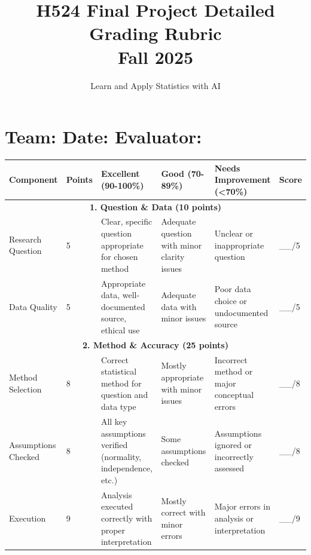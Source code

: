 \documentclass[11pt]{article}
\title{\textbf{H524 Final Project Detailed Grading Rubric\\Fall 2025}}
\author{Learn and Apply Statistics with AI}
\date{}
\begin{document}
\maketitle

\section*{Team: \underline{\hspace{4cm}} \quad Date: \underline{\hspace{3cm}} \quad Evaluator: \underline{\hspace{4cm}}}

\begin{longtable}{|p{3cm}|p{1.2cm}|p{3.5cm}|p{3.5cm}|p{3.5cm}|p{1.2cm}|}
\hline
\textbf{Component} & \textbf{Points} & \textbf{\textcolor{excellent}{Excellent (90-100\%)}} & \textbf{\textcolor{good}{Good (70-89\%)}} & \textbf{\textcolor{needs}{Needs Improvement (<70\%)}} & \textbf{Score} \\
\hline
\endhead

\multicolumn{6}{|c|}{\textbf{1. Question \& Data (10 points)}} \\
\hline

Research Question & 5 &
Clear, specific question appropriate for chosen method &
Adequate question with minor clarity issues &
Unclear or inappropriate question &
\_\_/5 \\
\hline

Data Quality & 5 &
Appropriate data, well-documented source, ethical use &
Adequate data with minor issues &
Poor data choice or undocumented source &
\_\_/5 \\
\hline

\multicolumn{6}{|c|}{\textbf{2. Method \& Accuracy (25 points)}} \\
\hline

Method Selection & 8 &
Correct statistical method for question and data type &
Mostly appropriate with minor issues &
Incorrect method or major conceptual errors &
\_\_/8 \\
\hline

Assumptions Checked & 8 &
All key assumptions verified (normality, independence, etc.) &
Some assumptions checked &
Assumptions ignored or incorrectly assessed &
\_\_/8 \\
\hline

Execution & 9 &
Analysis executed correctly with proper interpretation &
Mostly correct with minor errors &
Major errors in analysis or interpretation &
\_\_/9 \\
\hline


\end{longtable}
\end{document}
